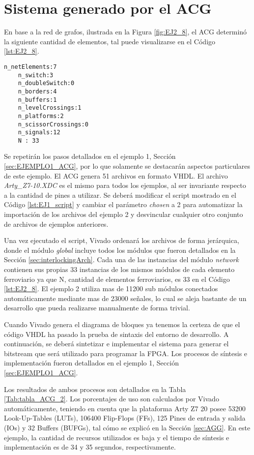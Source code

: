 \section{Sistema generado por el ACG}

	En base a la red de grafos, ilustrada en la Figura \ref{fig:EJ2_8}, el ACG determinó la siguiente cantidad de elementos, tal puede visualizarse en el Código \ref{lst:EJ2_8}.
	
	\begin{lstlisting}[language = {}, caption = Cantidad de elementos a implementar por el ACG, label = {lst:EJ2_8}]
	n_netElements:7
	n_switch:3
	n_doubleSwitch:0
	n_borders:4
	n_buffers:1
	n_levelCrossings:1
	n_platforms:2
	n_scissorCrossings:0
	n_signals:12
	N : 33
	\end{lstlisting}
	
	Se repetirán los pasos detallados en el ejemplo 1, Sección \ref{sec:EJEMPLO1_ACG}, por lo que solamente se destacarán aspectos particulares de este ejemplo. El ACG genera 51 archivos en formato VHDL. El archivo \textit{Arty\_Z7-10.XDC} es el mismo para todos los ejemplos, al ser invariante respecto a la cantidad de pines a utilizar. Se deberá modificar el script mostrado en el Código \ref{lst:EJ1_script} y cambiar el parámetro \textit{chosen} a 2 para automatizar la importación de los archivos del ejemplo 2 y desvincular cualquier otro conjunto de archivos de ejemplos anteriores.
	
	Una vez ejecutado el script, Vivado ordenará los archivos de forma jerárquica, donde el módulo \textit{global} incluye todos los módulos que fueron detallados en la Sección \ref{sec:interlockingArch}. Cada una de las instancias del módulo \textit{network} contienen sus propias 33 instancias de los mismos módulos de cada elemento ferroviario ya que N, cantidad de elementos ferroviarios, es 33 en el Código \ref{lst:EJ2_8}. El ejemplo 2 utiliza mas de 11200 sub módulos conectados automáticamente mediante mas de 23000 señales, lo cual se aleja bastante de un desarrollo que pueda realizarse manualmente de forma trivial.
	
	Cuando Vivado genera el diagrama de bloques ya tenemos la certeza de que el código VHDL ha pasado la prueba de sintaxis del entorno de desarrollo. A continuación, se deberá sintetizar e implementar el sistema para generar el bitstream que será utilizado para programar la FPGA. Los procesos de síntesis e implementación fueron detallados en el ejemplo 1, Sección \ref{sec:EJEMPLO1_ACG}.
	
	Los resultados de ambos procesos son detallados en la Tabla \ref{Tab:tabla_ACG_2}. Los porcentajes de uso son calculados por Vivado automáticamente, teniendo en cuenta que la plataforma Arty Z7 20 posee 53200 Look-Up-Tables (LUTs), 106400 Flip-Flops (FFs), 125 Pines de entrada y salida (IOs) y 32 Buffers (BUFGs), tal cómo se explicó en la Sección \ref{sec:AGG}. En este ejemplo, la cantidad de recursos utilizados es baja y el tiempo de síntesis e implementación es de 34 y 35 segundos, respectivamente.
	
